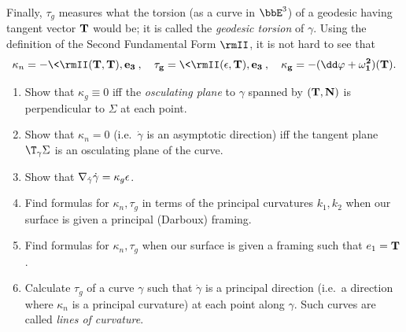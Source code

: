 Finally, $\tau_g$ measures what the torsion (as a curve in $\bbE^3$) of a geodesic having tangent vector $\bf{T}$ would be; it is called the \emph{geodesic torsion} of $\gamma$. Using the definition of the Second Fundamental Form $\rmII$, it is not hard to see that 
\[\kappa_n=-\<\rmII(\bf{T},\bf{T}),e_3\>,\quad \tau_g=\<\rmII(\bf{\epsilon},\bf{T}),e_3\>,\quad \kappa_g=-(\dd \varphi+\omega^2_1)(\bf{T}).\]

\begin{xca}
    \begin{enumerate}
        \item Show that $\kappa_g\equiv 0$ iff the \emph{osculating plane} to $\gamma$ spanned by $(\bf{T},\bf{N})$ is perpendicular to $\Sigma$ at each point.
        \item Show that $\kappa_n=0$ (i.e.\ $\dot\gamma$ is an asymptotic direction) iff the tangent plane $\T_{\gamma}\Sigma$ is an osculating plane of the curve.
        \item Show that $\nabla_{\dot\gamma}\dot\gamma=\kappa_g\bf{\epsilon}$.
        \item Find formulas for $\kappa_n,\tau_g$ in terms of the principal curvatures $k_1,k_2$ when our surface is given a principal (Darboux) framing.
        \item Find formulas for $\kappa_n,\tau_g$ when our surface is given a framing such that $e_1=\bf{T}$.
        \item Calculate $\tau_g$ of a curve $\gamma$ such that $\dot\gamma$ is a principal direction (i.e.\ a direction where $\kappa_n$ is a principal curvature) at each point along $\gamma$. Such curves are called \emph{lines of curvature}.
    \end{enumerate}
\end{xca}

